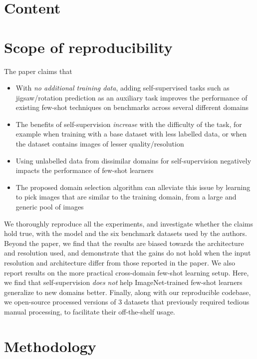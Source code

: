 \clearpage

\section{Content}

\section{Scope of reproducibility}
\label{sec:claims}

The paper claims that 

\begin{itemize}
    \item With \textit{no additional training data}, adding self-supervised tasks such as jigsaw/rotation prediction as an auxiliary task improves the performance of existing few-shot techniques on benchmarks across several different domains
    \item The benefits of self-supervision \textit{increase} with the difficulty of the task, for example when training with a base dataset with less labelled data, or when the dataset contains images of lesser quality/resolution
    \item Using unlabelled data from dissimilar domains for self-supervision negatively impacts the performance of few-shot learners
    \item The proposed domain selection algorithm can alleviate this issue by learning to pick images that are similar to the training domain, from a large and generic pool of images 
\end{itemize}

We thoroughly reproduce all the experiments, and investigate whether the claims hold true, with the model and the six benchmark datasets  used by the authors. Beyond the paper, we find that the results are biased towards the architecture and resolution used, and demonstrate that the gains do not hold when the input resolution and architecture differ from those reported in the paper. We also report results on the more practical cross-domain few-shot learning setup. Here, we find that self-supervision \textit{does not} help ImageNet-trained few-shot learners generalize to new domains better. Finally, along with our reproducible codebase, we open-source processed versions of $3$ datasets that previously required tedious manual processing, to facilitate their off-the-shelf usage.

\section{Methodology}

